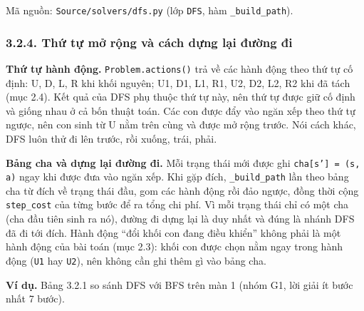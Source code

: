 Mã nguồn: \texttt{Source/\allowbreak{}solvers/\allowbreak{}dfs.\allowbreak{}py} (lớp \texttt{DFS}, hàm \texttt{\_\allowbreak{}build\_\allowbreak{}path}).

\subsubsection{3.2.4. Thứ tự mở rộng và cách dựng lại đường đi}

\textbf{Thứ tự hành động.} \texttt{Problem.\allowbreak{}actions()} trả về các hành động theo thứ tự cố định: U, D, L, R khi khối nguyên; U1, D1, L1, R1, U2, D2, L2, R2 khi đã tách (mục 2.4). Kết quả của DFS phụ thuộc thứ tự này, nên thứ tự được giữ cố định và giống nhau ở cả bốn thuật toán. Các con được đẩy vào ngăn xếp theo thứ tự ngược, nên con sinh từ U nằm trên cùng và được mở rộng trước. Nói cách khác, DFS luôn thử đi lên trước, rồi xuống, trái, phải.

\textbf{Bảng cha và dựng lại đường đi.} Mỗi trạng thái mới được ghi \texttt{cha[s'] = (s, a)} ngay khi được đưa vào ngăn xếp. Khi gặp đích, \texttt{\_\allowbreak{}build\_\allowbreak{}path} lần theo bảng cha từ đích về trạng thái đầu, gom các hành động rồi đảo ngược, đồng thời cộng \texttt{step\_\allowbreak{}cost} của từng bước để ra tổng chi phí. Vì mỗi trạng thái chỉ có một cha (cha đầu tiên sinh ra nó), đường đi dựng lại là duy nhất và đúng là nhánh DFS đã đi tới đích. Hành động ``đổi khối con đang điều khiển'' không phải là một hành động của bài toán (mục 2.3): khối con được chọn nằm ngay trong hành động (\texttt{U1} hay \texttt{U2}), nên không cần ghi thêm gì vào bảng cha.

\textbf{Ví dụ.} Bảng 3.2.1 so sánh DFS với BFS trên màn 1 (nhóm G1, lời giải ít bước nhất 7 bước).


